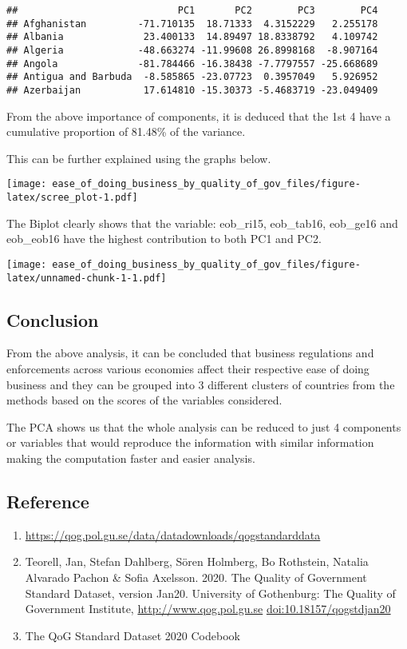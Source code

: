 \documentclass[
]{article}
\providecommand{\tightlist}{%
  \setlength{\itemsep}{0pt}\setlength{\parskip}{0pt}}
\begin{document}
\begin{verbatim}
##                            PC1       PC2        PC3        PC4
## Afghanistan         -71.710135  18.71333  4.3152229   2.255178
## Albania              23.400133  14.89497 18.8338792   4.109742
## Algeria             -48.663274 -11.99608 26.8998168  -8.907164
## Angola              -81.784466 -16.38438 -7.7797557 -25.668689
## Antigua and Barbuda  -8.585865 -23.07723  0.3957049   5.926952
## Azerbaijan           17.614810 -15.30373 -5.4683719 -23.049409
\end{verbatim}

From the above importance of components, it is deduced that the 1st 4
have a cumulative proportion of 81.48\% of the variance.

This can be further explained using the graphs below.

\texttt{[image: ease\_of\_doing\_business\_by\_quality\_of\_gov\_files/figure-latex/scree\_plot-1.pdf]}

The Biplot clearly shows that the variable: eob\_ri15, eob\_tab16,
eob\_ge16 and eob\_eob16 have the highest contribution to both PC1 and
PC2.

\texttt{[image: ease\_of\_doing\_business\_by\_quality\_of\_gov\_files/figure-latex/unnamed-chunk-1-1.pdf]}

\hypertarget{conclusion}{%
\subsection{Conclusion}\label{conclusion}}

From the above analysis, it can be concluded that business regulations
and enforcements across various economies affect their respective ease
of doing business and they can be grouped into 3 different clusters of
countries from the methods based on the scores of the variables
considered.

The PCA shows us that the whole analysis can be reduced to just 4
components or variables that would reproduce the information with
similar information making the computation faster and easier analysis.

\hypertarget{reference}{%
\subsection{Reference}\label{reference}}

\begin{enumerate}
\def\labelenumi{\arabic{enumi})}
\tightlist
\item
  \url{https://qog.pol.gu.se/data/datadownloads/qogstandarddata}
\item
  Teorell, Jan, Stefan Dahlberg, Sören Holmberg, Bo Rothstein, Natalia
  Alvarado Pachon \& Sofia Axelsson. 2020. The Quality of Government
  Standard Dataset, version Jan20. University of Gothenburg: The Quality
  of Government Institute, \url{http://www.qog.pol.gu.se}
  \url{doi:10.18157/qogstdjan20}
\item
  The QoG Standard Dataset 2020 Codebook
\end{enumerate}
\end{document}
